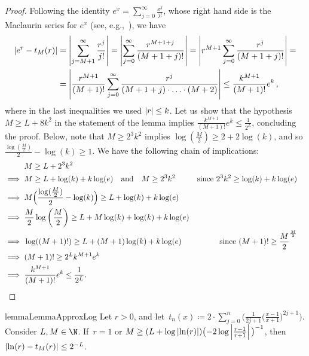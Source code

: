 \begin{proof}
  Following the identity $e^ x = \sum_{j=0}^\infty \frac{x^j}{j!}$, 
  whose right hand side is the Maclaurin series for $e^x$ (see, e.g.,~\cite[Equation~4.2.19]{Olver10}), we have
  \begin{equation*}\label{inequality-exp-taylor}
    \begin{aligned}
      \left|e^r-t_M(r)\right|&=\left|\sum_{j=M+1}^\infty \frac{r^j}{j!}\right| = 
      \left|\sum_{j=0}^\infty \frac{r^{M+1+j}}{(M+1+j)!} \right| = 
      \left|r^{M+1}\sum^\infty_{j=0}\frac{r^j}{(M+1+j)!}\right| = \\
      &=\left|\frac{r^{M+1}}{(M+1)!}\sum_{j=0}^\infty
      \frac{r^j}{(M+1+j)\cdot{\dots}\cdot(M+2)}\right|\leq
      \frac{k^{M+1}}{(M+1)!}e^k\,,
    \end{aligned}
  \end{equation*}
  where in the last inequalities we used $\left|r\right| \leq k$. 
  Let us show that the hypothesis $M \geq L + 8k^2$ in the statement of the lemma implies $\frac{k^{M+1}}{(M+1)!}e^k\leq \frac{1}{2^L}$, 
  concluding the proof. 
  Below, note that $M \geq 2^3k^2$ implies $\log(\frac{M}{2}) \geq 2 + 2 \log(k)$, and so $\frac{\log(\frac{M}{2})}{2} - \log(k) \geq 1$.
  We have the following chain of implications:
  \begin{align*}
    &M\geq L+2^3k^2\\
    \implies{}&M\geq L+\log(k)+k\log(e) \quad\text{and}\quad M\geq 2^3k^2
    & \text{since $2^3k^2 \geq \log(k) + k\log(e)$}\\
    \implies{}&M\Big( \frac{\log(\frac{M}{2})}{2}-\log(k) \Big) \geq
    L+\log(k)+k\log(e)\\
    \implies{}&\frac{M}{2}\log\left( \frac{M}{2} \right)\geq 
    L+M\log(k) + \log(k) + k\log(e)\\
    \implies{}&\log((M+1)!)\geq L+(M+1)\log(k) + k\log(e)
    &\text{since }(M+1)!\geq \frac{M}{2}^{\frac{M}{2}}\\
    \implies{}&(M+1)!\geq 2^Lk^{M+1}e^k\\
    \implies{}& \frac{k^{M+1}}{(M+1)!}e^k\leq \frac{1}{2^L}.
    &&\qedhere
  \end{align*}
\end{proof}

\begin{restatable}{lemma}{LemmaApproxLog}
  \label{lemma:approx-log}
  Let $r > 0$, 
  and let~$t_n(x) \coloneqq 2 \cdot \sum_{j=0}^n \big(\frac{1}{2j+1} \big(\frac{x-1}{x+1}\big)^{2j+1}\big)$. Consider $L,M \in \N$. 
  If~$r = 1$ or $M \geq (L+\log\left|\ln(r)\right|) \big({-}2\log\left|\frac{r-1}{r+1}\right|\big)^{-1}$, then $\left|\ln(r) - t_M(r)\right| \leq 2^{-L}$.
\end{restatable}

